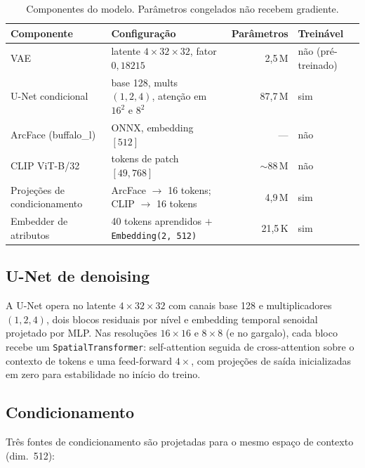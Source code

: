 \documentclass[10pt,twocolumn]{article}
\begin{document}
\begin{table}[t]
  \centering
  \caption{Componentes do modelo. Parâmetros congelados não recebem
  gradiente.}
  \label{tab:componentes}
  \small
  \begin{tabular}{llrl}
    \toprule
    \textbf{Componente} & \textbf{Configuração} & \textbf{Parâmetros} & \textbf{Treinável} \\
    \midrule
    VAE                           & latente $4{\times}32{\times}32$, fator $0{,}18215$            & 2,5\,M  & não (pré-treinado) \\
    U-Net condicional             & base 128, mults $(1,2,4)$, atenção em $16^2$ e $8^2$          & 87,7\,M & sim \\
    ArcFace (buffalo\_l)          & ONNX, embedding $[512]$                                       & ---     & não \\
    CLIP ViT-B/32                 & tokens de patch $[49, 768]$                                   & ${\sim}88$\,M & não \\
    Projeções de condicionamento  & ArcFace $\to$ 16 tokens; CLIP $\to$ 16 tokens                 & 4,9\,M  & sim \\
    Embedder de atributos         & 40 tokens aprendidos $+$ \texttt{Embedding(2, 512)}           & 21,5\,K & sim \\
    \bottomrule
  \end{tabular}
\end{table}

\subsection{U-Net de denoising}

A U-Net opera no latente $4{\times}32{\times}32$ com canais base 128 e
multiplicadores $(1, 2, 4)$, dois blocos residuais por nível e embedding
temporal senoidal projetado por MLP. Nas resoluções $16{\times}16$ e
$8{\times}8$ (e no gargalo), cada bloco recebe um
\texttt{SpatialTransformer}: self-attention seguida de cross-attention
sobre o contexto de tokens e uma feed-forward $4{\times}$, com projeções
de saída inicializadas em zero para estabilidade no início do treino.

\subsection{Condicionamento}

Três fontes de condicionamento são projetadas para o mesmo espaço de
contexto (dim.~512):
\end{document}
